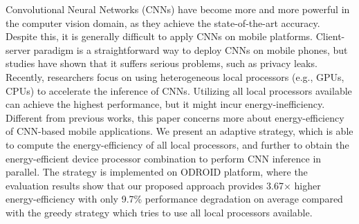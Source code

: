 \begin{enabstract}
Convolutional Neural Networks (CNNs) have become more and more powerful in the computer vision domain, as they achieve the state-of-the-art accuracy. Despite this, it is generally difficult to apply CNNs on mobile platforms. Client-server paradigm is a straightforward way to deploy CNNs on mobile phones, but studies have shown that it suffers serious problems, such as privacy leaks. Recently, researchers focus on using heterogeneous local processors (e.g., GPUs, CPUs) to accelerate the inference of CNNs. Utilizing all local processors available can achieve the highest performance, but it might incur energy-inefficiency. Different from previous works, this paper concerns more about energy-efficiency of
CNN-based mobile applications. We present an adaptive strategy, which is able to compute the energy-efficiency of all local processors, and further to obtain the energy-efficient device processor combination to perform CNN inference in parallel. The strategy is implemented on ODROID platform, where the evaluation results show that our proposed approach provides 3.67$\times$ higher energy-efficiency with only 9.7\% performance degradation on average compared with the greedy strategy which tries to use all local processors available.

\end{enabstract}
